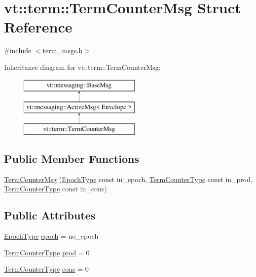 \hypertarget{structvt_1_1term_1_1_term_counter_msg}{}\section{vt\+:\+:term\+:\+:Term\+Counter\+Msg Struct Reference}
\label{structvt_1_1term_1_1_term_counter_msg}


{\ttfamily \#include $<$term\+\_\+msgs.\+h$>$}

Inheritance diagram for vt\+:\+:term\+:\+:Term\+Counter\+Msg\+:\begin{figure}[H]
\begin{center}
\leavevmode
\includegraphics[height=3.000000cm]{structvt_1_1term_1_1_term_counter_msg}
\end{center}
\end{figure}
\subsection*{Public Member Functions}
\begin{DoxyCompactItemize}
\item 
\hyperlink{structvt_1_1term_1_1_term_counter_msg_a5728a2f05ae6a3ccf0cac09098983b0f}{Term\+Counter\+Msg} (\hyperlink{namespacevt_a81d11b28122d43bf9834577e4a06440f}{Epoch\+Type} const in\+\_\+epoch, \hyperlink{namespacevt_1_1term_a4fd378cdb0c36683afc1b3399d685f7f}{Term\+Counter\+Type} const in\+\_\+prod, \hyperlink{namespacevt_1_1term_a4fd378cdb0c36683afc1b3399d685f7f}{Term\+Counter\+Type} const in\+\_\+cons)
\end{DoxyCompactItemize}
\subsection*{Public Attributes}
\begin{DoxyCompactItemize}
\item 
\hyperlink{namespacevt_a81d11b28122d43bf9834577e4a06440f}{Epoch\+Type} \hyperlink{structvt_1_1term_1_1_term_counter_msg_af523f9872306ba8ad1c4ad49694b3ee8}{epoch} = no\+\_\+epoch
\item 
\hyperlink{namespacevt_1_1term_a4fd378cdb0c36683afc1b3399d685f7f}{Term\+Counter\+Type} \hyperlink{structvt_1_1term_1_1_term_counter_msg_a4fd3f09a9e5a54865abbd76a95ea7067}{prod} = 0
\item 
\hyperlink{namespacevt_1_1term_a4fd378cdb0c36683afc1b3399d685f7f}{Term\+Counter\+Type} \hyperlink{structvt_1_1term_1_1_term_counter_msg_a212c8487c01cd837aae027823fa32208}{cons} = 0
\end{DoxyCompactItemize}
